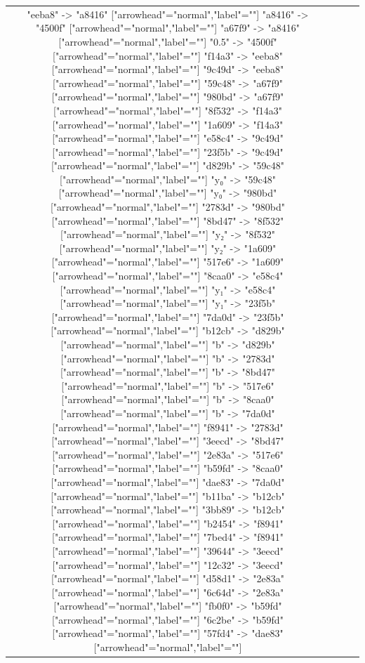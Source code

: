 \documentclass[11pt]{article}
\begin{document}
\begin{table}[H]
\begin{tabular}{|c|c|c|c|}
\begin{adjustbox}{minipage={.22\textwidth}, height=0.14\textwidth, margin*=0cm -0.3cm 0cm 0.1cm}
{    "eeba8" -> "a8416" ["arrowhead"="normal","label"=""]
    "a8416" -> "4500f" ["arrowhead"="normal","label"=""]
    "a67f9" -> "a8416" ["arrowhead"="normal","label"=""]
    "0.5" -> "4500f" ["arrowhead"="normal","label"=""]
    "f14a3" -> "eeba8" ["arrowhead"="normal","label"=""]
    "9c49d" -> "eeba8" ["arrowhead"="normal","label"=""]
    "59c48" -> "a67f9" ["arrowhead"="normal","label"=""]
    "980bd" -> "a67f9" ["arrowhead"="normal","label"=""]
    "8f532" -> "f14a3" ["arrowhead"="normal","label"=""]
    "1a609" -> "f14a3" ["arrowhead"="normal","label"=""]
    "e58c4" -> "9c49d" ["arrowhead"="normal","label"=""]
    "23f5b" -> "9c49d" ["arrowhead"="normal","label"=""]
    "d829b" -> "59c48" ["arrowhead"="normal","label"=""]
    "y₀" -> "59c48" ["arrowhead"="normal","label"=""]
    "y₀" -> "980bd" ["arrowhead"="normal","label"=""]
    "2783d" -> "980bd" ["arrowhead"="normal","label"=""]
    "8bd47" -> "8f532" ["arrowhead"="normal","label"=""]
    "y₂" -> "8f532" ["arrowhead"="normal","label"=""]
    "y₂" -> "1a609" ["arrowhead"="normal","label"=""]
    "517e6" -> "1a609" ["arrowhead"="normal","label"=""]
    "8caa0" -> "e58c4" ["arrowhead"="normal","label"=""]
    "y₁" -> "e58c4" ["arrowhead"="normal","label"=""]
    "y₁" -> "23f5b" ["arrowhead"="normal","label"=""]
    "7da0d" -> "23f5b" ["arrowhead"="normal","label"=""]
    "b12cb" -> "d829b" ["arrowhead"="normal","label"=""]
    "b" -> "d829b" ["arrowhead"="normal","label"=""]
    "b" -> "2783d" ["arrowhead"="normal","label"=""]
    "b" -> "8bd47" ["arrowhead"="normal","label"=""]
    "b" -> "517e6" ["arrowhead"="normal","label"=""]
    "b" -> "8caa0" ["arrowhead"="normal","label"=""]
    "b" -> "7da0d" ["arrowhead"="normal","label"=""]
    "f8941" -> "2783d" ["arrowhead"="normal","label"=""]
    "3eecd" -> "8bd47" ["arrowhead"="normal","label"=""]
    "2e83a" -> "517e6" ["arrowhead"="normal","label"=""]
    "b59fd" -> "8caa0" ["arrowhead"="normal","label"=""]
    "dae83" -> "7da0d" ["arrowhead"="normal","label"=""]
    "b11ba" -> "b12cb" ["arrowhead"="normal","label"=""]
    "3bb89" -> "b12cb" ["arrowhead"="normal","label"=""]
    "b2454" -> "f8941" ["arrowhead"="normal","label"=""]
    "7bed4" -> "f8941" ["arrowhead"="normal","label"=""]
    "39644" -> "3eecd" ["arrowhead"="normal","label"=""]
    "12c32" -> "3eecd" ["arrowhead"="normal","label"=""]
    "d58d1" -> "2e83a" ["arrowhead"="normal","label"=""]
    "6c64d" -> "2e83a" ["arrowhead"="normal","label"=""]
    "fb0f0" -> "b59fd" ["arrowhead"="normal","label"=""]
    "6c2be" -> "b59fd" ["arrowhead"="normal","label"=""]
    "57fd4" -> "dae83" ["arrowhead"="normal","label"=""]
}
\end{adjustbox}
\end{tabular}
\end{table}
\end{document}
